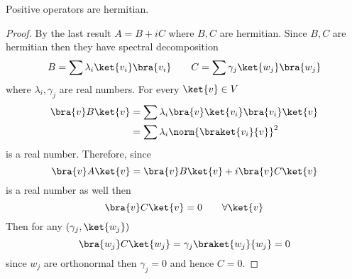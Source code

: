 \begin{proposition}
    Positive operators are hermitian. 
\end{proposition}
\begin{proof}
    By the last result \(A = B + iC\) where \(B,C\) are hermitian. Since \(B,C\) are hermitian then they have spectral decomposition
    \begin{equation*}
        B = \sum \lambda_i \ket{v_i}\bra{v_i}  \qquad C = \sum \gamma_j \ket{w_j}\bra{w_j}
    \end{equation*}
    where \(\lambda_i,\gamma_j\) are real numbers. For every \(\ket{v} \in V\)
    \begin{align*}
        \bra{v} B \ket{v} &= \sum \lambda_i \bra{v} \ket{v_i}\bra{v_i} \ket{v} \\
        &= \sum \lambda_i \norm{\braket{v_i}{v}}^2
    \end{align*}
    is a real number. Therefore, since
    \begin{equation*}
        \bra{v} A \ket{v} = \bra{v} B \ket{v}  + i \bra{v} C \ket{v}
    \end{equation*}
    is a real number as well then 
    \begin{equation*}
        \bra{v} C \ket{v} = 0 \qquad \forall \ket{v}
    \end{equation*}
    Then for any \((\gamma_j, \ket{w_j})\)
    \begin{equation*}
        \bra{w_j} C \ket{w_j} = \gamma_j \braket{w_j}{w_j} = 0
    \end{equation*}
    since \(w_j\) are orthonormal then \(\gamma_j = 0\) and hence \(C = 0 \).
\end{proof}
